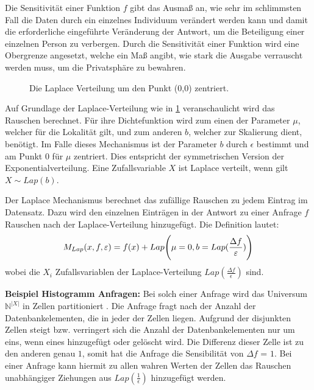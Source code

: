 Die Sensitivität einer Funktion $f$ gibt das Ausmaß an, wie sehr im schlimmsten Fall die Daten durch ein einzelnes Individuum verändert werden kann und damit die erforderliche eingeführte Veränderung der Antwort, um die Beteiligung einer einzelnen Person zu verbergen.
Durch die Sensitivität einer Funktion wird eine Obergrenze angesetzt, welche ein Maß angibt, wie stark die Ausgabe verrauscht werden muss, um die Privatsphäre zu bewahren.
\begin{figure}[htbp]\centering
	\caption{Die Laplace Verteilung um den Punkt ($0$,$0$) zentriert.}
	\label{fig:fig_laplace_dib}
\end{figure}

Auf Grundlage der Laplace-Verteilung wie in \cref{fig:fig_laplace_dib} veranschaulicht wird das Rauschen berechnet. Für ihre Dichtefunktion wird zum einen der Parameter $\mu$, welcher für die Lokalität gilt, und zum anderen $b$, welcher zur Skalierung dient, benötigt. Im Falle dieses Mechanismus ist der Parameter $b$ durch $\epsilon$ bestimmt und am Punkt $0$ für $\mu$ zentriert. Dies entspricht der symmetrischen Version der Exponentialverteilung. Eine Zufallsvariable $X$ ist Laplace verteilt, wenn gilt $X \sim Lap(b)$.

Der Laplace Mechanismus berechnet das zufällige Rauschen zu jedem Eintrag im Datensatz. Dazu wird den einzelnen Einträgen in der Antwort zu einer Anfrage $f$ Rauschen nach der Laplace-Verteilung hinzugefügt. Die Definition lautet:
\begin{equation*}
	M_{Lap} (x,f,\varepsilon) = f(x) + Lap\Biggl(\mu = 0, b = Lap(\frac{\Delta f}{\varepsilon})\Biggr)
\end{equation*}
wobei die $X_{i}$ Zufallsvariablen der Laplace-Verteilung $Lap(\frac{\Delta f}{\epsilon})$ sind.


\textbf{Beispiel Histogramm Anfragen: }
Bei solch einer Anfrage wird das Universum $\mathbb{N}^{|X|}$ in Zellen partitioniert \parencite{AlgoFoundations2014}. Die Anfrage fragt nach der Anzahl der Datenbankelementen, die in jeder der Zellen liegen. Aufgrund der disjunkten Zellen steigt bzw. verringert sich die Anzahl der Datenbankelementen nur um eins, wenn eines hinzugefügt oder gelöscht wird. Die Differenz dieser Zelle ist zu den anderen genau $1$, somit hat die Anfrage die Sensibilität von $\Delta f$ = $1$. Bei einer Anfrage kann hiermit zu allen wahren Werten der Zellen das Rauschen unabhängiger Ziehungen aus $Lap(\frac{1}{\epsilon})$ hinzugefügt werden.


